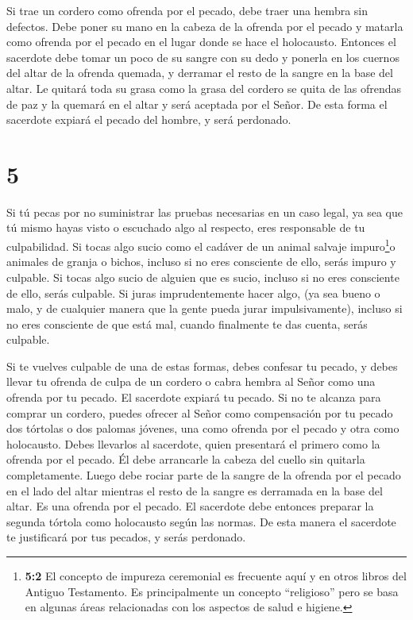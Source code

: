  Si trae un cordero como ofrenda por el pecado, debe traer
una hembra sin defectos.  Debe poner su mano en la cabeza
de la ofrenda por el pecado y matarla como ofrenda por el pecado en el
lugar donde se hace el holocausto.  Entonces el sacerdote
debe tomar un poco de su sangre con su dedo y ponerla en los cuernos del
altar de la ofrenda quemada, y derramar el resto de la sangre en la base
del altar.  Le quitará toda su grasa como la grasa del
cordero se quita de las ofrendas de paz y la quemará en el altar y será
aceptada por el Señor. De esta forma el sacerdote expiará el pecado del
hombre, y será perdonado.

\hypertarget{section-4}{%
\section{5}\label{section-4}}

 Si tú pecas por no suministrar las pruebas necesarias en un
caso legal, ya sea que tú mismo hayas visto o escuchado algo al
respecto, eres responsable de tu culpabilidad.  Si tocas
algo sucio como el cadáver de un animal salvaje impuro\footnote{\textbf{5:2}
  El concepto de impureza ceremonial es frecuente aquí y en otros libros
  del Antiguo Testamento. Es principalmente un concepto ``religioso''
  pero se basa en algunas áreas relacionadas con los aspectos de salud e
  higiene.}o animales de granja o bichos, incluso si no eres consciente
de ello, serás impuro y culpable.  Si tocas algo sucio de
alguien que es sucio, incluso si no eres consciente de ello, serás
culpable.  Si juras imprudentemente hacer algo, (ya sea
bueno o malo, y de cualquier manera que la gente pueda jurar
impulsivamente), incluso si no eres consciente de que está mal, cuando
finalmente te das cuenta, serás culpable.

 Si te vuelves culpable de una de estas formas, debes
confesar tu pecado,  y debes llevar tu ofrenda de culpa de
un cordero o cabra hembra al Señor como una ofrenda por tu pecado. El
sacerdote expiará tu pecado.  Si no te alcanza para comprar
un cordero, puedes ofrecer al Señor como compensación por tu pecado dos
tórtolas o dos palomas jóvenes, una como ofrenda por el pecado y otra
como holocausto.  Debes llevarlos al sacerdote, quien
presentará el primero como la ofrenda por el pecado. Él debe arrancarle
la cabeza del cuello sin quitarla completamente.  Luego debe
rociar parte de la sangre de la ofrenda por el pecado en el lado del
altar mientras el resto de la sangre es derramada en la base del altar.
Es una ofrenda por el pecado.  El sacerdote debe entonces
preparar la segunda tórtola como holocausto según las normas. De esta
manera el sacerdote te justificará por tus pecados, y serás perdonado.

